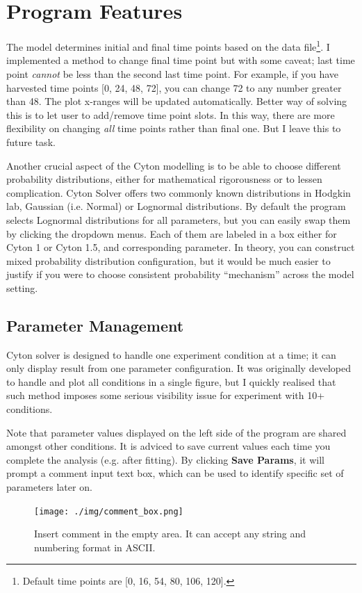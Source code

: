 \documentclass{article}
\newcommand{\enterProblemHeader}[1]{
    }
\newcommand{\exitProblemHeader}[1]{
    }
\newcounter{homeworkProblemCounter} %
\newcommand{\homeworkProblemName}{}
\newenvironment{homeworkProblem}[1][Problem \arabic{homeworkProblemCounter}]{ %
    \stepcounter{homeworkProblemCounter} %
    \renewcommand{\homeworkProblemName}{#1} %
    \section{\homeworkProblemName} %
    \enterProblemHeader{\homeworkProblemName} %
    }{
    \exitProblemHeader{\homeworkProblemName} %
    }
\begin{document}
\begin{homeworkProblem}[Program Features]
        The model determines initial and final time points based on the data file\footnote{Default time points are [0, 16, 54, 80, 106, 120].}. I implemented a method to change final time point but with some caveat; last time point \textit{cannot} be less than the second last time point. For example, if you have harvested time points [0, 24, 48, 72], you can change 72 to any number greater than 48. The plot x-ranges will be updated automatically. Better way of solving this is to let user to add/remove time point slots. In this way, there are more flexibility on changing \textit{all} time points rather than final one. But I leave this to future task.

        Another crucial aspect of the Cyton modelling is to be able to choose different probability distributions, either for mathematical rigorousness or to lessen complication. Cyton Solver offers two commonly known distributions in Hodgkin lab, Gaussian (i.e. Normal) or Lognormal distributions. By default the program selects Lognormal distributions for all parameters, but you can easily swap them by clicking the dropdown menus. Each of them are labeled in a box either for Cyton 1 or Cyton 1.5, and corresponding parameter. In theory, you can construct mixed probability distribution configuration, but it would be much easier to justify if you were to choose consistent probability ``mechanism'' across the model setting.

        \subsection{Parameter Management}
        Cyton solver is designed to handle one experiment condition at a time; it can only display result from one parameter configuration. It was originally developed to handle and plot all conditions in a single figure, but I quickly realised that such method imposes some serious visibility issue for experiment with 10+ conditions.

        Note that parameter values displayed on the left side of the program are shared amongst other conditions. It is adviced to save current values each time you complete the analysis (e.g. after fitting). By clicking \textbf{Save Params}, it will prompt a comment input text box, which can be used to identify specific set of parameters later on.
        \begin{figure}[h]
            \centering
            \texttt{[image: ./img/comment\_box.png]}
            \caption{Insert comment in the empty area. It can accept any string and numbering format in ASCII.}
            \label{fig:comment_box}
        \end{figure}


\end{homeworkProblem}
\end{document}
